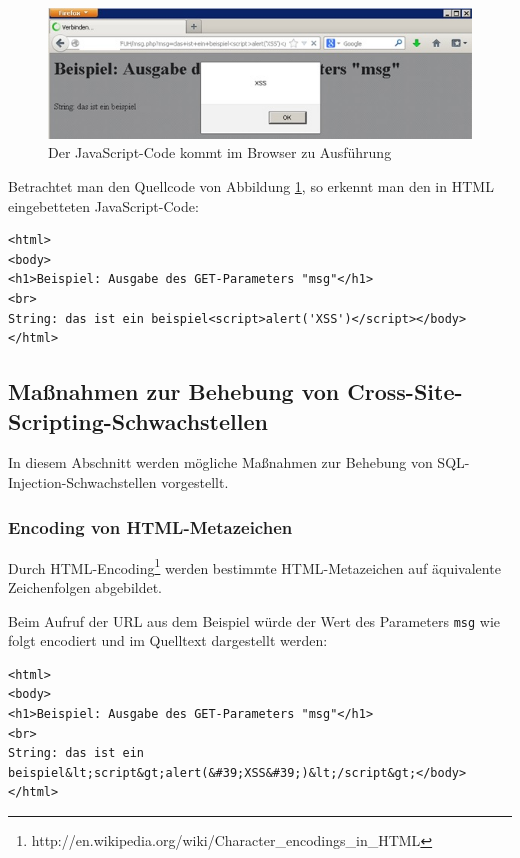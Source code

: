 \begin{figure}[htbp]
 \centering
 \includegraphics[scale=.75]{abbildungen/xss_2}
 \caption{Der JavaScript-Code kommt im Browser zu Ausführung}
 \label{fig:xss_2} 
\end{figure}

Betrachtet man den Quellcode von Abbildung \ref{fig:xss_2}, so erkennt man den in HTML eingebetteten JavaScript-Code:

\begin{lstlisting}[basicstyle=\ttfamily\footnotesize]
<html>
<body>
<h1>Beispiel: Ausgabe des GET-Parameters "msg"</h1>
<br>
String: das ist ein beispiel<script>alert('XSS')</script></body>
</html>
\end{lstlisting}

\subsection{Maßnahmen zur Behebung von Cross-Site-Scripting-Schwachstellen}
	
In diesem Abschnitt werden mögliche Maßnahmen zur Behebung von SQL-Injection-Schwachstellen vorgestellt.

\subsubsection{Encoding von HTML-Metazeichen}
	
Durch HTML-Encoding\footnote{http://en.wikipedia.org/wiki/Character\_encodings\_in\_HTML} werden bestimmte HTML-Metazeichen auf äquivalente Zeichenfolgen abgebildet.

Beim Aufruf der URL aus dem Beispiel würde der Wert des Parameters \texttt{msg} wie folgt encodiert und im Quelltext dargestellt werden:

\begin{lstlisting}[basicstyle=\ttfamily\footnotesize]
<html>
<body>
<h1>Beispiel: Ausgabe des GET-Parameters "msg"</h1>
<br>
String: das ist ein beispiel&lt;script&gt;alert(&#39;XSS&#39;)&lt;/script&gt;</body>
</html>
\end{lstlisting}

